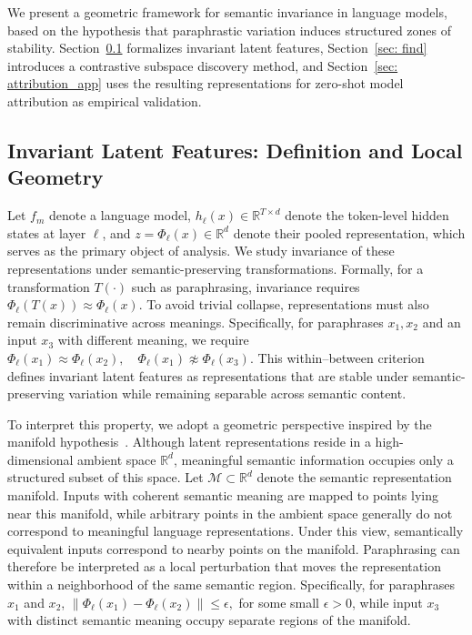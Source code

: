 
We present a geometric framework for semantic invariance in language models, based on the hypothesis that paraphrastic variation induces structured zones of stability. Section~\ref{sec: define} formalizes invariant latent features, Section~\ref{sec: find} introduces a contrastive subspace discovery method, and Section~\ref{sec: attribution_app} uses the resulting representations for zero-shot model attribution as empirical validation.

\subsection{Invariant Latent Features: Definition and Local Geometry}
\label{sec: define}

Let \(f_m\) denote a language model, \(h_\ell(x)\in\mathbb{R}^{T\times d}\) denote the token-level hidden states at layer \(\ell\), and \(z=\Phi_\ell(x)\in\mathbb{R}^d\) denote their pooled representation, which serves as the primary object of analysis. 
We study invariance of these representations under semantic-preserving transformations. Formally, for a transformation \(T(\cdot)\) such as paraphrasing, invariance requires
\(
\Phi_\ell(T(x)) \approx \Phi_\ell(x).
\)
To avoid trivial collapse, representations must also remain discriminative across meanings. Specifically, for paraphrases \(x_1,x_2\) and an input \(x_3\) with different meaning, we require
\(
\Phi_\ell(x_1) \approx \Phi_\ell(x_2), \quad
\Phi_\ell(x_1) \not\approx \Phi_\ell(x_3).
\)
This within--between criterion defines invariant latent features as representations that are stable under semantic-preserving variation while remaining separable across semantic content. 

To interpret this property, we adopt a geometric perspective inspired by the manifold hypothesis~\cite{fefferman2016testing}. Although latent representations reside in a high-dimensional ambient space \(\mathbb{R}^d\), meaningful semantic information occupies only a structured subset of this space. Let \(\mathcal{M} \subset \mathbb{R}^d\) denote the semantic representation manifold. Inputs with coherent semantic meaning are mapped to points lying near this manifold, while arbitrary points in the ambient space generally do not correspond to meaningful language representations. 
Under this view, semantically equivalent inputs correspond to nearby points on the manifold. Paraphrasing can therefore be interpreted as a local perturbation that moves the representation within a neighborhood of the same semantic region. Specifically, for paraphrases \(x_1\) and \(x_2\),
\(
\|\Phi_\ell(x_1) - \Phi_\ell(x_2)\| \leq \epsilon,
\)
for some small \(\epsilon > 0\), while input \(x_3\) with distinct semantic meaning occupy separate regions of the manifold.

